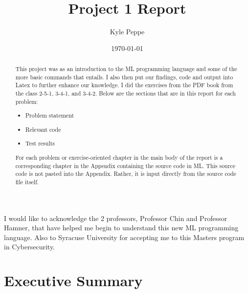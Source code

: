 \documentclass{report}
\title{Project 1 Report}
\author{Kyle Peppe}
\date{\today}
\begin{document}
\lstset{language=ML}


\maketitle{}

\begin{abstract}
  This project was as an introduction to the ML programming language 
  and some of the more basic commands that entails. I also then put
  our findings, code and output into Latex to further enhance our
  knowledge. I did the exercises from the PDF book from the class
  2-5-1, 3-4-1, and 3-4-2. Below are the sections that are in this
  report for each problem:
  \begin{itemize}
  \item Problem statement
  \item Relevant code
  \item Test results 
  \end{itemize}
  
  For each problem or exercise-oriented chapter in the main body of
  the report is a corresponding chapter in the Appendix containing the
  source code in ML.  This source code is not pasted into the
  Appendix.  Rather, it is input directly from the source code file
  itself.

\end{abstract}

\begin{acknowledgments}
  I would like to acknowledge the 2 professors, Professor Chin and 
  Professor Hamner, that have helped me begin to understand this new
  ML programming language. Also to Syracuse University for accepting
  me to this Masters program in Cybersecurity.
\end{acknowledgments}

\tableofcontents{}


\chapter{Executive Summary}
\label{cha:executive-summary}
\end{document}
